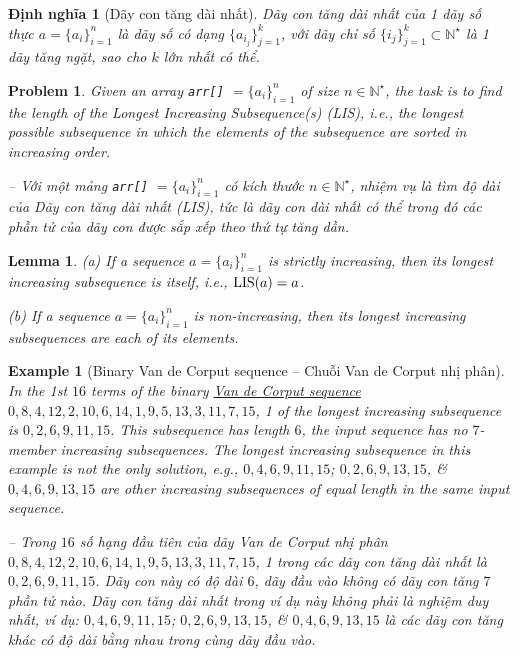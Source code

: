 \documentclass{article}
\newtheorem{dinhnghia}{Định nghĩa}
\newtheorem{example}{Example}
\newtheorem{lemma}{Lemma}
\newtheorem{problem}{Problem}
\begin{document}
\begin{dinhnghia}[Dãy con tăng dài nhất]
    {\rm Dãy con tăng dài nhất} của 1 dãy số thực $a = \{a_i\}_{i=1}^n$ là dãy số có dạng $\{a_{i_j}\}_{j=1}^k$, với dãy chỉ số $\{i_j\}_{j=1}^k\subset\mathbb{N}^\star$ là 1 dãy tăng ngặt, sao cho $k$ lớn nhất có thể.
\end{dinhnghia}

\begin{problem}
    Given an array {\tt arr[]} $= \{a_i\}_{i=1}^n$ of size $n\in\mathbb{N}^\star$, the task is to find the length of the Longest Increasing Subsequence(s) (LIS), i.e., the longest possible subsequence in which the elements of the subsequence are sorted in increasing order.

    -- Với một mảng {\tt arr[]} $= \{a_i\}_{i=1}^n$ có kích thước $n\in\mathbb{N}^\star$, nhiệm vụ là tìm độ dài của Dãy con tăng dài nhất (LIS), tức là dãy con dài nhất có thể trong đó các phần tử của dãy con được sắp xếp theo thứ tự tăng dần.
\end{problem}

\begin{lemma}
    (a) If a sequence $a = \{a_i\}_{i=1}^n$ is strictly increasing, then its longest increasing subsequence is itself, i.e., ${\rm LIS}(a) = a$.
    \item(b) If a sequence $a = \{a_i\}_{i=1}^n$ is  non-increasing, then its longest increasing subsequences are each of its elements.
\end{lemma}

\begin{example}[Binary Van de Corput sequence -- Chuỗi Van de Corput nhị phân]
    In the 1st $16$ terms of the binary \href{https://en.wikipedia.org/wiki/Van_der_Corput_sequence}{Van de Corput sequence} $0, 8, 4, 12, 2, 10, 6, 14, 1, 9, 5, 13, 3, 11, 7, 15$, 1 of the longest increasing subsequence is $0, 2, 6, 9, 11, 15$. This subsequence has length $6$, the input sequence has no $7$-member increasing subsequences. The longest increasing subsequence in this example is not the only solution, e.g., $0, 4, 6, 9, 11, 15$; $0, 2, 6, 9, 13, 15$, \& $0, 4, 6, 9, 13, 15$ are other increasing subsequences of equal length in the same input sequence.

    -- Trong $16$ số hạng đầu tiên của dãy Van de Corput nhị phân $0, 8, 4, 12, 2, 10, 6, 14, 1, 9, 5, 13, 3, 11, 7, 15$, 1 trong các dãy con tăng dài nhất là $0, 2, 6, 9, 11, 15$. Dãy con này có độ dài $6$, dãy đầu vào không có dãy con tăng $7$ phần tử nào. Dãy con tăng dài nhất trong ví dụ này không phải là nghiệm duy nhất, ví dụ: $0, 4, 6, 9, 11, 15$; $0, 2, 6, 9, 13, 15$, \& $0, 4, 6, 9, 13, 15$ là các dãy con tăng khác có độ dài bằng nhau trong cùng dãy đầu vào.
\end{example}
\end{document}
